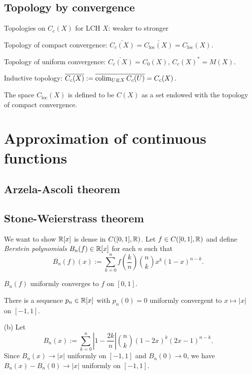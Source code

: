 \documentclass{../note}
\begin{document}
\section{Topology by convergence}

Topologies on $C_c(X)$ for LCH $X$: weaker to stronger
\begin{parts}
\item Topology of compact convergence: $\bar{C_c(X)}=\bar{C_{\mathrm{loc}}(X)}=C_{\mathrm{loc}}(X)$.
\item Topology of uniform convergence: $\bar{C_c(X)}=C_0(X)$, $C_c(X)^*=M(X)$.
\item Inductive topology: $\overline{C_c(X)}:=\overline{\operatorname*{colim}_{U\Subset X}C_c(U)}=C_c(X)$.
\end{parts}
The space $C_{\mathrm{loc}}(X)$ is defined to be $C(X)$ as a set endowed with the topology of compact convergence.





\chapter{Approximation of continuous functions}
\section{Arzela-Ascoli theorem}

\section{Stone-Weierstrass theorem}

\begin{prb}
We want to show $\mathbb{R}[x]$ is dense in $C([0,1],\mathbb{R})$.
Let $f\in C([0,1],\mathbb{R})$ and define \emph{Berstein polynomials} $B_n(f)\in\mathbb{R}[x]$ for each $n$ such that
\[B_n(f)(x):=\sum_{k=0}^nf\left(\frac kn\right)\binom nkx^k(1-x)^{n-k}.\]
\begin{parts}
\item $B_n(f)$ uniformly converges to $f$ on $[0,1]$.
\item There is a sequence $p_n\in\mathbb{R}[x]$ with $p_n(0)=0$ uniformly convergent to $x\mapsto|x|$ on $[-1,1]$.
\end{parts}
\end{prb}
\begin{pf}
(b)
Let
\[B_n(x):=\sum_{k=0}^n\left|1-\frac{2k}n\right|\binom nk(1-2x)^k(2x-1)^{n-k}.\]
Since $B_n(x)\to|x|$ uniformly on $[-1,1]$ and $B_n(0)\to0$, we have $B_n(x)-B_n(0)\to|x|$ uniformly on $[-1,1]$.
\end{pf}
\end{document}
